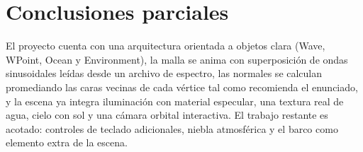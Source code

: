 ﻿\documentclass[11pt]{article}
\begin{document}
\section{Conclusiones parciales}

El proyecto cuenta con una arquitectura orientada a objetos clara (Wave,
WPoint, Ocean y Environment), la malla se anima con superposición de ondas sinusoidales
leídas desde un archivo de espectro, las normales se calculan promediando las
caras vecinas de cada vértice tal como recomienda el enunciado, y la escena
ya integra iluminación con material especular, una textura real de agua, cielo
con sol y una cámara orbital interactiva. El trabajo restante es acotado:
controles de teclado adicionales, niebla atmosférica y el barco como elemento
extra de la escena.
\end{document}
